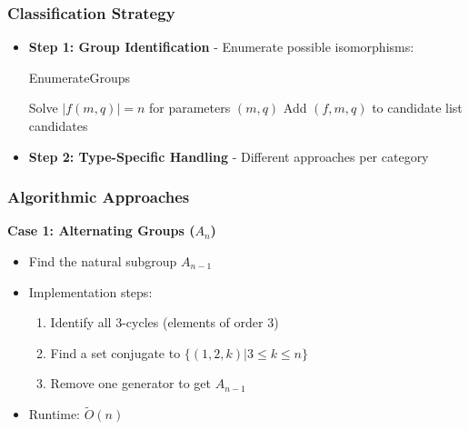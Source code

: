 \documentclass[sigconf]{acmart}
\begin{document}
\subsubsection{Classification Strategy}
\begin{itemize}
    \item \textbf{Step 1: Group Identification} - Enumerate possible isomorphisms:
    \begin{algorithm}[H]
    \caption{EnumerateGroups}
    \begin{algorithmic}[1]
        \STATE Solve $|f(m,q)| = n$ for parameters $(m,q)$
            \STATE Add $(f,m,q)$ to candidate list
        \ENDIF
    \ENDFOR
    \RETURN candidates
    \end{algorithmic}
    \end{algorithm}
    
    \item \textbf{Step 2: Type-Specific Handling} - Different approaches per category
\end{itemize}

\subsubsection{Algorithmic Approaches}

\textbf{Case 1: Alternating Groups ($A_n$)}
\begin{itemize}
    \item Find the natural subgroup $A_{n-1}$
    \item Implementation steps:
    \begin{enumerate}
        \item Identify all 3-cycles (elements of order 3)
        \item Find a set conjugate to $\{(1,2,k) | 3 \leq k \leq n\}$
        \item Remove one generator to get $A_{n-1}$
    \end{enumerate}
    \item Runtime: $\widetilde{O}(n)$
\end{itemize}
\end{document}
